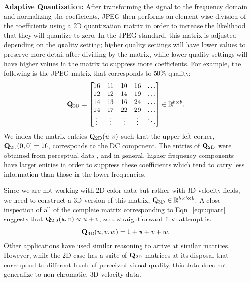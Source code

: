 \noindent \textbf{Adaptive Quantization:} After transforming the signal to the frequency domain and normalizing the coefficients, JPEG then performs an element-wise division of the coefficients using a 2D quantization matrix in order to increase the likelihood that they will quantize to zero. In the JPEG standard, this matrix is adjusted depending on the quality setting; higher quality settings will have lower values to preserve more detail after dividing by the matrix, while lower quality settings will have higher values in the matrix to suppress more coefficients. For example, the following is the JPEG matrix that corresponds to 50\% quality:
\begin{equation}
\label{eqn:quant}
\mathbf{Q}_{\textrm{2D}} = \begin{bmatrix}
16 & 11 & 10 & 16  &\ldots\\
12 & 12 & 14 & 19 & \ldots\\
14 & 13 & 16 & 24  & \ldots \\
14 & 17 & 22 & 29   & \ldots\\
\vdots & \vdots      &  \vdots    &  \vdots      & \ddots
\end{bmatrix} \in \mathbb{R}^{b \times b}.
\end{equation}
We index the matrix entries $\mathbf{Q}_{\textrm{2D}}(u,v)$ such that the upper-left corner, $\mathbf{Q}_{\textrm{2D}}(0,0) = 16$, corresponds to the DC component.  The entries of $\mathbf{Q}_{\textrm{2D}}$ were obtained from perceptual data \cite{Sayood:2012:JPEG}, and in general, higher frequency components have larger entries in order to suppress these coefficients which tend to carry less information than those in the lower frequencies.

Since we are not working with 2D color data but rather with 3D velocity fields, we need to construct a 3D version of this matrix, $\mathbf{Q}_{\textrm{3D}} \in \mathbb{R}^{b \times b \times b}$. A close inspection of all of the complete matrix corresponding to Eqn.~\ref{eqn:quant} suggests that $\mathbf{Q}_{\textrm{2D}}(u,v) \propto u + v$, so a straightforward first attempt is:
\begin{equation}
\mathbf{Q}_{\textrm{3D}}(u,v,w) = 1 + u + v + w.
\end{equation}
Other applications \cite{Yeo:1995:VRD} have used similar reasoning to arrive at similar matrices. However, while the 2D case has a suite of $\mathbf{Q}_{\textrm{2D}}$ matrices at its disposal that correspond to different levels of perceived visual quality, this data does not generalize to non-chromatic, 3D velocity data.

